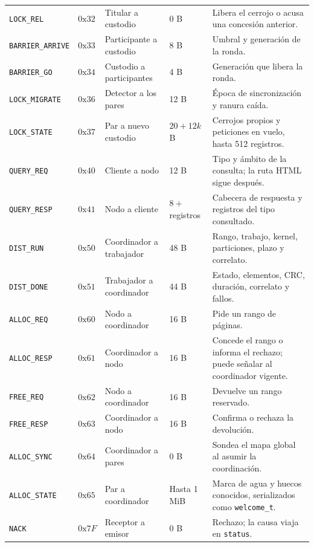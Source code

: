 {\begin{xltabular}{\linewidth}{l l P{3.55cm} P{1.75cm} Y}
\texttt{LOCK\_REL} & $0\text{x}32$ & Titular a custodio & 0 B & Libera el cerrojo o acusa una concesión anterior. \\
\texttt{BARRIER\_ARRIVE} & $0\text{x}33$ & Participante a custodio & 8 B & Umbral y generación de la ronda. \\
\texttt{BARRIER\_GO} & $0\text{x}34$ & Custodio a participantes & 4 B & Generación que libera la ronda. \\
\texttt{LOCK\_MIGRATE} & $0\text{x}36$ & Detector a los pares & 12 B & Época de sincronización y ranura caída. \\
\texttt{LOCK\_STATE} & $0\text{x}37$ & Par a nuevo custodio & $20 + 12k$ B & Cerrojos propios y peticiones en vuelo, hasta 512 registros. \\
\texttt{QUERY\_REQ} & $0\text{x}40$ & Cliente a nodo & 12 B & Tipo y ámbito de la consulta; la ruta HTML sigue después. \\
\texttt{QUERY\_RESP} & $0\text{x}41$ & Nodo a cliente & $8 + $ registros & Cabecera de respuesta y registros del tipo consultado. \\
\texttt{DIST\_RUN} & $0\text{x}50$ & Coordinador a trabajador & 48 B & Rango, trabajo, kernel, particiones, plazo y correlato. \\
\texttt{DIST\_DONE} & $0\text{x}51$ & Trabajador a coordinador & 44 B & Estado, elementos, CRC, duración, correlato y fallos. \\
\texttt{ALLOC\_REQ} & $0\text{x}60$ & Nodo a coordinador & 16 B & Pide un rango de páginas. \\
\texttt{ALLOC\_RESP} & $0\text{x}61$ & Coordinador a nodo & 16 B & Concede el rango o informa el rechazo; puede señalar al coordinador vigente. \\
\texttt{FREE\_REQ} & $0\text{x}62$ & Nodo a coordinador & 16 B & Devuelve un rango reservado. \\
\texttt{FREE\_RESP} & $0\text{x}63$ & Coordinador a nodo & 16 B & Confirma o rechaza la devolución. \\
\texttt{ALLOC\_SYNC} & $0\text{x}64$ & Coordinador a pares & 0 B & Sondea el mapa global al asumir la coordinación. \\
\texttt{ALLOC\_STATE} & $0\text{x}65$ & Par a coordinador & Hasta 1 MiB & Marca de agua y huecos conocidos, serializados como \texttt{welcome\_t}. \\
\texttt{NACK} & $0\text{x}7F$ & Receptor a emisor & 0 B & Rechazo; la causa viaja en \texttt{status}. \\
\bottomrule
\end{xltabular}
}

